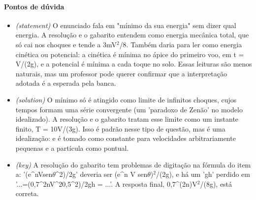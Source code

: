 \documentclass{article}%
\begin{document}
\paragraph{Pontos de dúvida}%
\begin{itemize}%
\item%
\textit{(statement)} O enunciado fala em "mínimo da sua energia" sem dizer qual energia. A resolução e o gabarito entendem como energia mecânica total, que só cai nos choques e tende a 3mV$^2$/8. Também daria para ler como energia cinética ou potencial: a cinética é mínima no ápice do primeiro voo, em t = V/(2g), e a potencial é mínima a cada toque no solo. Essas leituras são menos naturais, mas um professor pode querer confirmar que a interpretação adotada é a esperada pela banca.%
\item%
\textit{(solution)} O mínimo só é atingido como limite de infinitos choques, cujos tempos formam uma série convergente (um 'paradoxo de Zenão' no modelo idealizado). A resolução e o gabarito tratam esse limite como um instante finito, T = 10V/(3g). Isso é padrão nesse tipo de questão, mas é uma idealização: e é tomado como constante para velocidades arbitrariamente pequenas e a partícula como pontual.%
\item%
\textit{(key)} A resolução do gabarito tem problemas de digitação na fórmula do item a: '(e\^{}nVsen$\theta$\^{}2)/2g' deveria ser (e\^{}n V sen$\theta$)$^2$/(2g), e há um 'gh' perdido em '...=(0,7\^{}2nV\^{}20,5\^{}2)/2gh = ...'. A resposta final, 0,7\^{}(2n)V$^2$/(8g), está correta.%
\end{itemize}%
\end{document}
